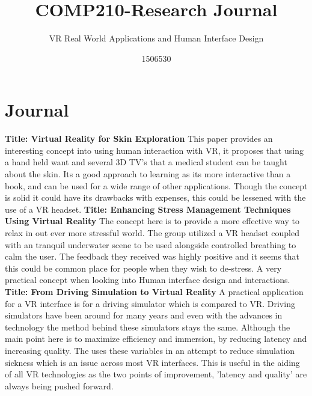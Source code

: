 \documentclass{scrartcl}
\title{COMP210-Research Journal}
\subtitle{VR Real World Applications and Human Interface Design}
\author{1506530}
\begin{document}
	
	
\maketitle
\section{Journal}

		\newline
		\newline
		\textbf{Title: Virtual Reality for Skin Exploration}\cite{Vazquez}
		\newline
		This paper provides an interesting concept into using human interaction with VR, it proposes that using a hand held want and several 3D TV's that a medical student can be taught about the skin. Its a good approach to learning as its more interactive than a book, and can be used for a wide range of other applications. Though the concept is solid it could have its drawbacks with expenses, this could be lessened with the use of a VR headset. 
		\newline
		\newline
		\newline
		\textbf{Title: Enhancing Stress Management Techniques Using Virtual Reality}\cite{Soyka}
		\newline
		 The concept here is to provide a more effective way to relax in out ever more stressful world. The group utilized a VR headset coupled with an tranquil underwater scene to be used alongside controlled breathing to calm the user. The feedback they received was highly positive and it seems that this could be common place for people when they wish to de-stress. A very practical concept when looking into Human interface design and interactions.
		\newline
		\newline
		\newline
		\textbf{Title: From Driving Simulation to Virtual Reality}\cite{Kemeny}
		\newline
		 A practical application for a VR interface is for a driving simulator which is compared to VR. Driving simulators have been around for many years and even with the advances in technology the method behind these simulators stays the same. Although the main point here is to maximize efficiency and immersion, by reducing latency and increasing quality. The uses these variables in an attempt to reduce simulation sickness which is an issue across most VR interfaces. This is useful in the aiding of all VR technologies as the two points of improvement, 'latency and quality' are always being pushed forward.
\end{document}
